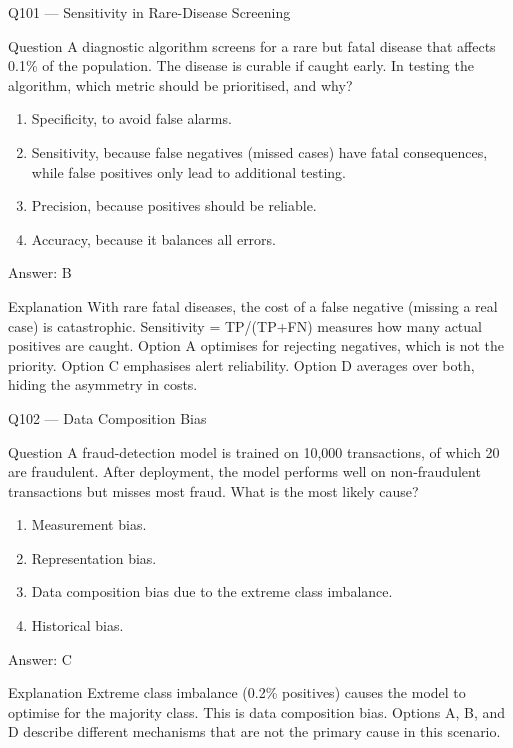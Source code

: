 \documentclass[aspectratio=169,8pt]{beamer}
\begin{document}
\begin{frame}{Q101 --- Sensitivity in Rare-Disease Screening}
\begin{block}{Question}
A diagnostic algorithm screens for a rare but fatal disease that affects 0.1\% of the population. The disease is curable if caught early. In testing the algorithm, which metric should be prioritised, and why?
\end{block}
\begin{enumerate}
\item Specificity, to avoid false alarms.
\item Sensitivity, because false negatives (missed cases) have fatal consequences, while false positives only lead to additional testing.
\item Precision, because positives should be reliable.
\item Accuracy, because it balances all errors.
\end{enumerate}
\begin{exampleblock}{Answer: B}\end{exampleblock}
\begin{block}{Explanation}
With rare fatal diseases, the cost of a false negative (missing a real case) is catastrophic. Sensitivity = TP/(TP+FN) measures how many actual positives are caught. Option A optimises for rejecting negatives, which is not the priority. Option C emphasises alert reliability. Option D averages over both, hiding the asymmetry in costs.
\end{block}
\end{frame}

\begin{frame}{Q102 --- Data Composition Bias}
\begin{block}{Question}
A fraud-detection model is trained on 10,000 transactions, of which 20 are fraudulent. After deployment, the model performs well on non-fraudulent transactions but misses most fraud. What is the most likely cause?
\end{block}
\begin{enumerate}
\item Measurement bias.
\item Representation bias.
\item Data composition bias due to the extreme class imbalance.
\item Historical bias.
\end{enumerate}
\begin{exampleblock}{Answer: C}\end{exampleblock}
\begin{block}{Explanation}
Extreme class imbalance (0.2\% positives) causes the model to optimise for the majority class. This is data composition bias. Options A, B, and D describe different mechanisms that are not the primary cause in this scenario.
\end{block}
\end{frame}
\end{document}
